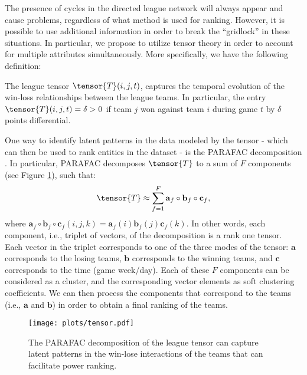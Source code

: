 The presence of cycles in the directed league network will always appear and cause problems, regardless of what method is used for ranking.  
However, it is possible to use additional information in order to break the ``gridlock'' in these situations.  
In particular, we propose to utilize tensor theory in order to account for multiple attributes simultaneously.  
More specifically, we have the following definition: 

\begin{lemma}
The league tensor $\tensor{T}(i,j,t)$, captures the temporal evolution of the win-loss relationships between the league teams. In particular, the entry $\tensor{T}(i,j,t)=\delta > 0$ if team $j$ won against team $i$ during game $t$ by $\delta$ points differential. 
\label{def:tens}
\end{lemma}  

One way to identify latent patterns in the data modeled by the tensor - which can then be used to rank entities in the dataset - is the PARAFAC decomposition \cite{parafac}.  
In particular, PARAFAC decomposes $\tensor{T}$ to a sum of $F$ components (see Figure \ref{fig:tensor}), such that: 
\begin{equation}
\tensor{T} \approx \displaystyle {\sum_{f=1}^F  \mathbf{a}_f \circ \mathbf{b}_f \circ \mathbf{c}_f },
\label{eq:tesor_dec}
\end{equation}
where $ \mathbf{a}_f \circ \mathbf{b}_f \circ \mathbf{c}_f (i,j,k) = \mathbf{a}_f(i) \mathbf{b}_f (j) \mathbf{c}_f (k) $. 
In other words, each component, i.e., triplet of vectors, of the decomposition is a rank one tensor.
Each vector in the triplet corresponds to one of the three modes of the tensor: $\mathbf{a}$ corresponds to the losing teams, $\mathbf{b}$ corresponds to the winning teams, and $\mathbf{c}$ corresponds to the time (game week/day).
Each of these $F$ components can be considered as a cluster, and the corresponding vector elements as soft clustering coefficients. 
We can then process the components that correspond to the teams (i.e., $\mathbf{a}$ and $\mathbf{b}$) in order to obtain a final ranking of the teams.   

\begin{figure}[t]
\begin{center}
\vspace{-0.35in}
\texttt{[image: plots/tensor.pdf]}%
\vspace{-0.4in}
 \caption{The PARAFAC decomposition of the league tensor can capture latent patterns in the win-lose interactions of the teams that can facilitate power ranking.}
 \label{fig:tensor}
\end{center}
\vspace{-0.2in}
\end{figure}

